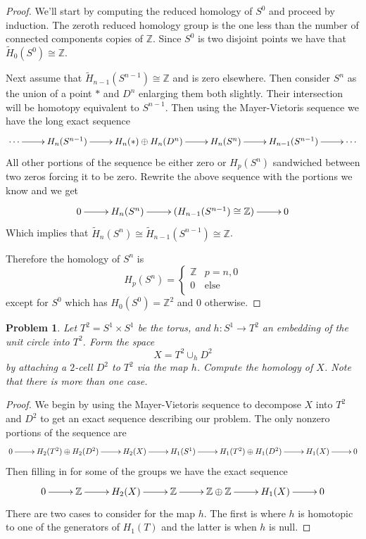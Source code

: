 \documentclass[10pt]{article}
\newcommand{\bb}[1]{\mathbb{#1}}
\newcommand{\wt}[1]{\widetilde{#1}}
\theoremstyle{plain}
\newtheorem{problem}{Problem}
\theoremstyle{remark}
\begin{document}
\begin{proof}
  We'll start by computing the reduced homology of $S^0$ and proceed by induction.
  The zeroth reduced homology group is the one less than the number of
  connected components copies of $\bb{Z}$. Since $S^0$ is two disjoint points we
  have that $\wt{H}_0(S^0)\cong\bb{Z}$.

  Next assume that $\wt{H}_{n-1}(S^{n-1})\cong\bb{Z}$ and is zero elsewhere.
  Then consider $S^n$ as the union of a point $*$ and $D^n$ enlarging them both slightly.
  Their intersection will be homotopy equivalent to $S^{n-1}$.
  Then using the Mayer-Vietoris sequence we have the long exact sequence
  \[
    \xymatrix{
      \cdots \ar[r] &H_n(S^{n-1}) \ar[r] & H_n(*)\oplus H_n(D^n)\ar[r] & H_n(S^n) \ar[r]
      &H_{n-1}(S^{n-1})\ar[r] & \cdots \\
    }
  \]
  All other portions of the sequence be either zero or $H_p(S^n)$ sandwiched between
  two zeros forcing it to be zero. Rewrite the above sequence with the portions
  we know and we get
  \[
    \xymatrix{
      0\ar[r] & H_n(S^n) \ar[r]& (H_{n-1}(S^{n-1})\cong\bb{Z})\ar[r] & 0\\
    }
  \]
  Which implies that $\wt{H}_n(S^n)\cong \wt{H}_{n-1}(S^{n-1})\cong\bb{Z}$.

  Therefore the homology of $S^n$ is
  \[ H_p(S^n)=\left\{
      \begin{array}{cc}
        \bb{Z}& p=n,0\\
        0 & \mathrm{else}\\
      \end{array}
    \right.\]
  except for $S^0$ which has $H_0(S^0)=\bb{Z}^2$ and 0 otherwise.
\end{proof}

\begin{problem}
  Let $T^2 = S^1 \times S^1$ be the torus, and $h: S^1 \to T^2$ an embedding of the unit
  circle into $T^2$. Form the space 
  \begin{equation*}
    X = T^2 \cup_h D^2
  \end{equation*}
  by attaching a $2$-cell $D^2$ to $T^2$ via the map $h$. Compute the homology of $X$.
  Note that there is more than one case.
\end{problem}

\begin{proof}
  We begin by using the Mayer-Vietoris sequence to decompose $X$ into $T^2$ and $D^2$
  to get an exact sequence describing our problem. The only nonzero portions of
  the sequence are
  \[
    \xymatrix{
    0 \ar[r] & H_2(T^2)\oplus H_2(D^2) \ar[r] & H_2(X) \ar[r] & H_1(S^1) \ar[r] &
    H_1(T^2)\oplus H_1(D^2) \ar[r] & H_1(X) \ar[r] & 0\\
    }
  \]
  Then filling in for some of the groups we have the exact sequence
  \[
    \xymatrix{
      0 \ar[r] & \bb{Z} \ar[r] & H_2(X) \ar[r] & \bb{Z} \ar[r]
      &\bb{Z}\oplus\bb{Z}\ar[r] & H_1(X)\ar[r] & 0
    }
  \]
  There are two cases to consider for the map $h$. The first is where $h$
  is homotopic to one of the generators of $H_1(T)$ and the latter is when $h$
  is null.
\end{proof}


\end{document}
